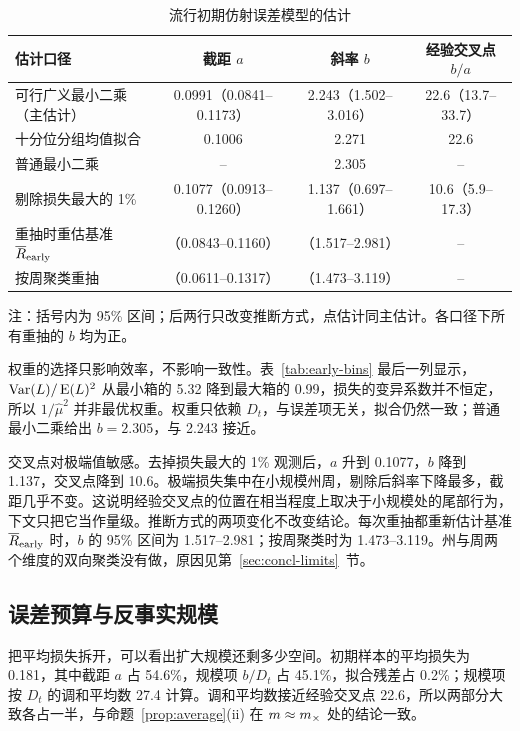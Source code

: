 \begin{table}[!tbp]
  \centering
  \caption{流行初期仿射误差模型的估计}
  \label{tab:affine}
  \small
  \begin{tabular}{@{}lccc@{}}
    \toprule
    估计口径 & 截距 $a$ & 斜率 $b$ & 经验交叉点 $b/a$ \\
    \midrule
    可行广义最小二乘（主估计） & 0.0991（0.0841--0.1173） & 2.243（1.502--3.016） & 22.6（13.7--33.7） \\
    十分位分组均值拟合 & 0.1006 & 2.271 & 22.6 \\
    普通最小二乘 & -- & 2.305 & -- \\
    剔除损失最大的 1\% & 0.1077（0.0913--0.1260） & 1.137（0.697--1.661） & 10.6（5.9--17.3） \\
    重抽时重估基准 $\overline{R}_{\mathrm{early}}$ & （0.0843--0.1160） & （1.517--2.981） & -- \\
    按周聚类重抽 & （0.0611--0.1317） & （1.473--3.119） & -- \\
    \bottomrule
  \end{tabular}

  \vspace{4pt}
  {\small 注：括号内为 95\% 区间；后两行只改变推断方式，点估计同主估计。各口径下所有重抽的 $b$ 均为正。}
\end{table}

权重的选择只影响效率，不影响一致性。表~\ref{tab:early-bins} 最后一列显示，$\operatorname{Var}(L)/\operatorname{E}(L)^2$ 从最小箱的 5.32 降到最大箱的 0.99，损失的变异系数并不恒定，所以 $1/\hat\mu^2$ 并非最优权重。权重只依赖 $D_t$，与误差项无关，拟合仍然一致；普通最小二乘给出 $b=2.305$，与 2.243 接近。

交叉点对极端值敏感。去掉损失最大的 1\% 观测后，$a$ 升到 0.1077，$b$ 降到 1.137，交叉点降到 10.6。极端损失集中在小规模州周，剔除后斜率下降最多，截距几乎不变。这说明经验交叉点的位置在相当程度上取决于小规模处的尾部行为，下文只把它当作量级。推断方式的两项变化不改变结论。每次重抽都重新估计基准 $\overline{R}_{\mathrm{early}}$ 时，$b$ 的 95\% 区间为 1.517--2.981；按周聚类时为 1.473--3.119。州与周两个维度的双向聚类没有做，原因见第~\ref{sec:concl-limits}~节。

\subsection{误差预算与反事实规模}

把平均损失拆开，可以看出扩大规模还剩多少空间。初期样本的平均损失为 0.181，其中截距 $a$ 占 54.6\%，规模项 $b/D_t$ 占 45.1\%，拟合残差占 0.2\%；规模项按 $D_t$ 的调和平均数 27.4 计算。调和平均数接近经验交叉点 22.6，所以两部分大致各占一半，与命题~\ref{prop:average}(ii) 在 $m\approx m_{\times}$ 处的结论一致。

